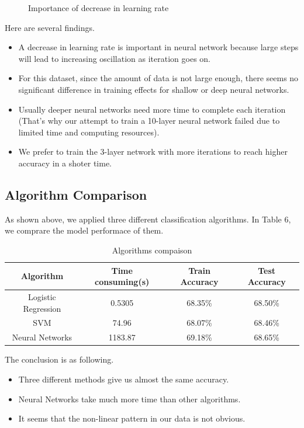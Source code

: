 \documentclass[a4paper,11pt,onecolumn,twoside]{article}
\begin{document}
\begin{figure}[htbp]
\begin{subfigure}[t]{0.31\textwidth}
	\end{subfigure}	
	\caption{Importance of decrease in learning rate }
\end{figure}
\par
Here are several findings.
\begin{itemize}
	\item A decrease in learning rate is important in neural network because large steps will lead to increasing oscillation as iteration goes on.
	\item For this dataset, since the amount of data is not large enough, there seems no significant difference in training effects for shallow or deep neural networks. 
	\item Usually deeper neural networks need more time to complete each iteration (That's why our attempt to train a 10-layer neural network failed due to limited time and computing resources).
	\item  We prefer to train the 3-layer network with more iterations to reach higher accuracy in a shoter time. 
\end{itemize}
\subsection{Algorithm Comparison}
As shown above, we applied three different classification algorithms. In Table 6, we comprare the model performace of them.
\begin{table}[htbp]
	\centering
	\begin{tabular}{cccc}
		\midrule[1.5pt]
		\textbf{Algorithm} &\textbf{Time consuming}(s)  &\textbf{Train Accuracy}&\textbf{Test Accuracy}\\
		\hline
		Logistic Regression&0.5305&68.35\%&68.50\%\\
		SVM  &74.96&68.07\%&68.46\%\\
		Neural Networks&1183.87&69.18\%&68.65\%\\
		\midrule[1.5pt]
	\end{tabular}
	\caption{Algorithms compaison}
\end{table}
\par The conclusion is as following.
\begin{itemize}
	\item Three different methods give us almost the same accuracy.
	\item Neural Networks take much more time than other algorithms.
	\item It seems that the non-linear pattern in our data is not obvious.
\end{itemize}
\end{document}
